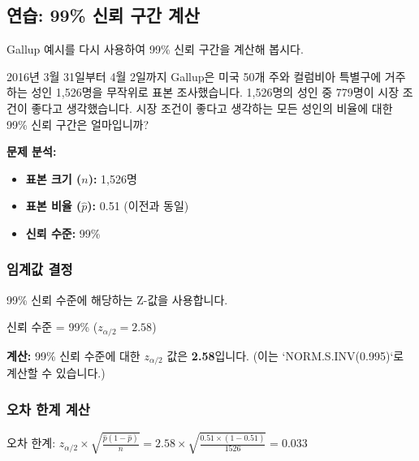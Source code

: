 \documentclass[11pt,a4paper]{article}
\begin{document}
\subsection{연습: 99\% 신뢰 구간 계산}

Gallup 예시를 다시 사용하여 99\% 신뢰 구간을 계산해 봅시다.

\begin{tcolorbox}[title=슬라이드 77: 연습]
2016년 3월 31일부터 4월 2일까지 Gallup은 미국 50개 주와 컬럼비아 특별구에 거주하는 성인 1,526명을 무작위로 표본 조사했습니다. 1,526명의 성인 중 779명이 시장 조건이 좋다고 생각했습니다.
시장 조건이 좋다고 생각하는 모든 성인의 비율에 대한 99\% 신뢰 구간은 얼마입니까?
\end{tcolorbox}

\textbf{문제 분석:}
\begin{itemize}
    \item \textbf{표본 크기 ($n$):} 1,526명
    \item \textbf{표본 비율 ($\hat{p}$):} 0.51 (이전과 동일)
    \item \textbf{신뢰 수준:} 99\%
\end{itemize}

\subsubsection{임계값 결정}

99\% 신뢰 수준에 해당하는 Z-값을 사용합니다.

\begin{tcolorbox}[title=슬라이드 78: 연습 - 풀이]
신뢰 수준 = 99\% ($z_{\alpha/2} = 2.58$)
\end{tcolorbox}

\textbf{계산:}
99\% 신뢰 수준에 대한 $z_{\alpha/2}$ 값은 \textbf{2.58}입니다. (이는 `NORM.S.INV(0.995)`로 계산할 수 있습니다.)

\subsubsection{오차 한계 계산}

\begin{tcolorbox}[title=슬라이드 78: 연습 - 풀이]
오차 한계: $z_{\alpha/2} \times \sqrt{\frac{\hat{p}(1-\hat{p})}{n}} = 2.58 \times \sqrt{\frac{0.51 \times (1-0.51)}{1526}} = 0.033$
\end{tcolorbox}
\end{document}
